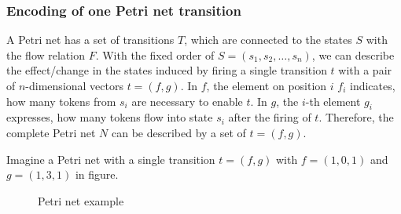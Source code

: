 \subsubsection{Encoding of one Petri net transition}
A Petri net has a set of transitions $T$, which are connected to the states $S$ with the flow relation $F$. 
With the fixed order of $S = (s_{1},s_{2},\dots,s_{n})$, we can describe the effect/change in the states induced by firing a single transition $t$ with a pair of $n$-dimensional vectors $t = (f,g)$. In $f$, the element on position $i$ $f_{i}$ indicates, how many tokens from $s_{i}$ are necessary to enable $t$. In $g$, the $i$-th element $g_{i}$ expresses, how many tokens flow into state $s_{i}$ after the firing of $t$. Therefore, the complete Petri net $N$ can be described by a set of $t = (f,g)$. 


\par 

Imagine a Petri net with a single transition $t=(f,g)$ with $f = (1,0,1)$ and $g = (1,3,1)$ in figure.

\begin{figure}[htb]
\centering 
\caption{Petri net example}\label{fig:pnet}
\end{figure}


